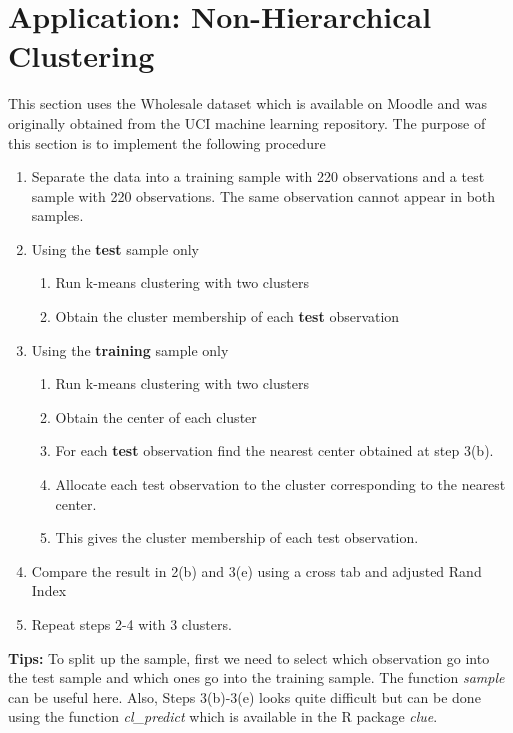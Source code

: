\documentclass{article}
\begin{document}
\section*{Application: Non-Hierarchical Clustering}
This section uses the Wholesale dataset which is available on Moodle and was originally obtained from the UCI machine learning repository.  The purpose of this section is to implement the following procedure
\begin{enumerate}
	\item Separate the data into a training sample with 220 observations and a test sample  with  220 observations.   The  same  observation  cannot  appear  in both samples.
	\item  Using the {\bf test} sample only
	\begin{enumerate}
		\item Run k-means clustering with two clusters
		\item  Obtain the cluster membership of each {\bf test}
		observation
	\end{enumerate}
	\item  Using the {\bf training} sample only
	\begin{enumerate}
		\item Run k-means clustering with two clusters
		\item Obtain the center of each cluster
		\item For  each {\bf test} observation  find  the nearest  center  obtained  at  step 3(b).
		\item Allocate  each  test  observation  to  the  cluster  corresponding  to  the
		nearest center.
		\item This gives the cluster membership of each test observation.
	\end{enumerate}
	\item  Compare the result in 2(b) and 3(e) using a cross tab and adjusted Rand Index
    \item  Repeat steps 2-4 with 3 clusters.
\end{enumerate}
{\bf Tips:} To split up the sample, first we need to select which observation go into the test sample and which ones go into the training sample. The function {\em sample} can be useful here.  Also, Steps 3(b)-3(e) looks quite difficult but can be done using the function {\em cl\_predict}
which is available in the R package {\em clue}.
\end{document}
